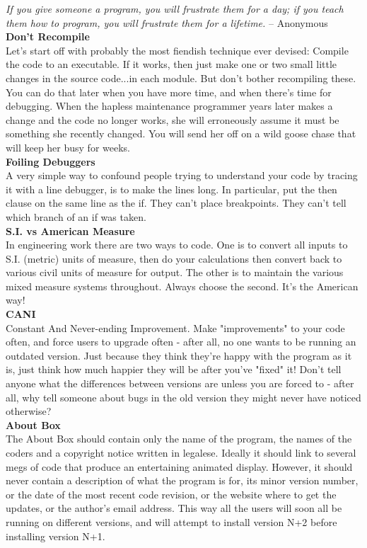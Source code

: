 \documentclass[11pt,twoside,a4paper]{article}
\begin{document}
\textit{If you give someone a program, you will frustrate them for a day; if you teach them how to program, you will frustrate them for a lifetime.} -- Anonymous~\\

\textbf{Don't Recompile}~\\
Let's start off with probably the most fiendish technique ever devised: Compile the code to an executable. If it works, then just make one or two small little changes in the source code...in each module. But don't bother recompiling these. You can do that later when you have more time, and when there's time for debugging. When the hapless maintenance programmer years later makes a change and the code no longer works, she will erroneously assume it must be something she recently changed. You will send her off on a wild goose chase that will keep her busy for weeks. ~\\

\textbf{Foiling Debuggers}~\\
A very simple way to confound people trying to understand your code by tracing it with a line debugger, is to make the lines long. In particular, put the then clause on the same line as the if. They can't place breakpoints. They can't tell which branch of an if was taken. ~\\

\textbf{S.I. vs American Measure}~\\
In engineering work there are two ways to code. One is to convert all inputs to S.I. (metric) units of measure, then do your calculations then convert back to various civil units of measure for output. The other is to maintain the various mixed measure systems throughout. Always choose the second. It's the American way! ~\\

\textbf{CANI}~\\
Constant And Never-ending Improvement. Make "improvements" to your code often, and force users to upgrade often - after all, no one wants to be running an outdated version. Just because they think they're happy with the program as it is, just think how much happier they will be after you've "fixed" it! Don't tell anyone what the differences between versions are unless you are forced to - after all, why tell someone about bugs in the old version they might never have noticed otherwise? ~\\

\textbf{About Box}~\\
The About Box should contain only the name of the program, the names of the coders and a copyright notice written in legalese. Ideally it should link to several megs of code that produce an entertaining animated display. However, it should never contain a description of what the program is for, its minor version number, or the date of the most recent code revision, or the website where to get the updates, or the author's email address. This way all the users will soon all be running on different versions, and will attempt to install version N+2 before installing version N+1. ~\\
\end{document}
